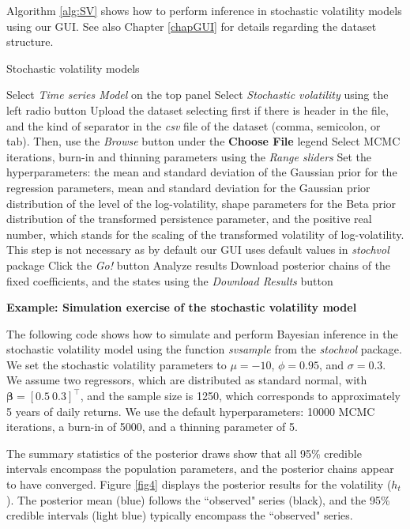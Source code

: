 Algorithm \ref{alg:SV} shows how to perform inference in stochastic volatility models using our GUI. See also Chapter \ref{chapGUI} for details regarding the dataset structure. 

\begin{algorithm}[h!]
	\caption{Stochastic volatility models}\label{alg:SV}
	\begin{algorithmic}[1]  		 			
		\State Select \textit{Time series Model} on the top panel
		\State Select \textit{Stochastic volatility} using the left radio button
		\State Upload the dataset selecting first if there is header in the file, and the kind of separator in the \textit{csv} file of the dataset (comma, semicolon, or tab). Then, use the \textit{Browse} button under the \textbf{Choose File} legend
		\State Select MCMC iterations, burn-in and thinning parameters using the \textit{Range sliders}
		\State Set the hyperparameters: the mean and standard deviation of the Gaussian prior for the regression parameters, mean and standard deviation for the Gaussian prior distribution of the level of the log-volatility, shape parameters for the Beta prior distribution of the transformed persistence parameter, and the positive real number, which stands for the scaling of the transformed volatility of log-volatility. This step is not necessary as by default our GUI uses default values in \textit{stochvol} package
		\State Click the \textit{Go!} button
		\State Analyze results
		\State Download posterior chains of the fixed coefficients, and the states using the \textit{Download Results} button
	\end{algorithmic} 
\end{algorithm}

\textbf{Example: Simulation exercise of the stochastic volatility model}

The following code shows how to simulate and perform Bayesian inference in the stochastic volatility model using the function \textit{svsample} from the \textit{stochvol} package. We set the stochastic volatility parameters to $\mu = -10$, $\phi = 0.95$, and $\sigma = 0.3$. We assume two regressors, which are distributed as standard normal, with $\bm{\beta} = [0.5 \ 0.3]^{\top}$, and the sample size is 1250, which corresponds to approximately 5 years of daily returns. We use the default hyperparameters: 10000 MCMC iterations, a burn-in of 5000, and a thinning parameter of 5.

The summary statistics of the posterior draws show that all 95\% credible intervals encompass the population parameters, and the posterior chains appear to have converged. Figure \ref{fig4} displays the posterior results for the volatility ($h_t$). The posterior mean (blue) follows the ``observed" series (black), and the 95\% credible intervals (light blue) typically encompass the ``observed" series.

